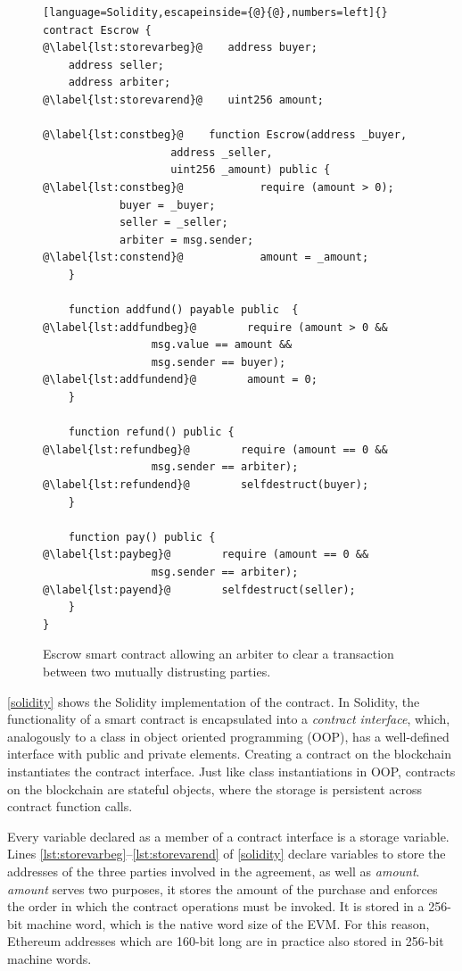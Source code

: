\documentclass[sigplan,10pt]{acmart}\settopmatter{printfolios=true,printccs=false,printacmref=false}
\begin{document}
\begin{figure}[h!]
\begin{lstlisting}[language=Solidity,escapeinside={@}{@},numbers=left]{}
contract Escrow {
@\label{lst:storevarbeg}@    address buyer;
    address seller;
    address arbiter;
@\label{lst:storevarend}@    uint256 amount;

@\label{lst:constbeg}@    function Escrow(address _buyer,
                    address _seller,
                    uint256 _amount) public {
@\label{lst:constbeg}@            require (amount > 0);
            buyer = _buyer;
            seller = _seller;
            arbiter = msg.sender;
@\label{lst:constend}@            amount = _amount;
    }

    function addfund() payable public  {
@\label{lst:addfundbeg}@        require (amount > 0 &&
                 msg.value == amount &&
                 msg.sender == buyer);
@\label{lst:addfundend}@        amount = 0;
    }

    function refund() public {
@\label{lst:refundbeg}@        require (amount == 0 &&
                 msg.sender == arbiter);
@\label{lst:refundend}@        selfdestruct(buyer);
    }

    function pay() public {
@\label{lst:paybeg}@        require (amount == 0 &&
                 msg.sender == arbiter);
@\label{lst:payend}@        selfdestruct(seller);
    }
}
\end{lstlisting}
\caption{Escrow smart contract allowing an arbiter to clear a
 transaction between two mutually distrusting parties.}
\label{solidity}
\end{figure}

\autoref{solidity} shows the Solidity implementation of the contract.
In Solidity, the functionality of a smart contract is encapsulated into a
\textit{contract interface}, which, analogously to a class in object oriented programming
(OOP), has a well-defined interface with public and private elements.
Creating a contract on the blockchain instantiates the contract interface.
Just like class instantiations in OOP, contracts on the blockchain are
stateful objects, where the storage is persistent across contract function calls.

Every variable declared as a member of a contract interface is
a storage variable.
Lines \autoref{lst:storevarbeg}--\autoref{lst:storevarend} of \autoref{solidity}
declare variables to store the addresses of the three parties
involved in the agreement, as well as \textit{amount}.
\textit{amount} serves two purposes, it stores
the amount of the purchase and enforces the order
in which the contract operations must be invoked.
It is stored in a 256-bit machine word, which is the
native word size of the EVM.
For this reason, Ethereum addresses which are 160-bit long
are in practice also stored in 256-bit machine words.
\end{document}
